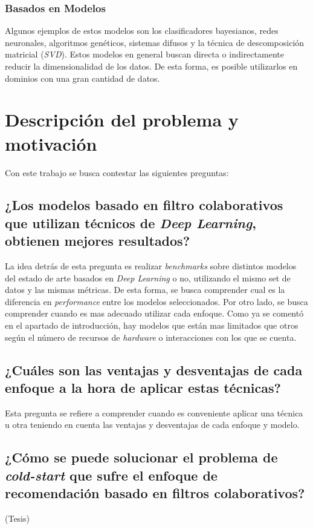 \documentclass[11pt,a4paper,twoside]{thesis}
\begin{document}
\subsubsection{Basados en Modelos}

Algunos ejemplos de estos modelos son los clasificadores bayesianos, redes
neuronales, algoritmos genéticos, sistemas difusos y la técnica de
descomposición matricial (\textit{SVD}). Estos modelos en general buscan
directa o indirectamente reducir la dimensionalidad de los datos. De esta
forma, es posible utilizarlos en dominios con una gran cantidad de datos.

\clearpage
\section{Descripción del problema y motivación}

Con este trabajo se busca contestar las siguientes preguntas:

\subsection{¿Los modelos basado en filtro colaborativos que utilizan técnicos de \textit{Deep Learning}, obtienen mejores resultados?}

La idea detrás de esta pregunta es realizar \textit{benchmarks} sobre distintos
modelos del estado de arte basados en \textit{Deep Learning} o no, utilizando
el mismo set de datos y las mismas métricas. De esta forma, se busca comprender
cual es la diferencia en \textit{performance} entre los modelos seleccionados.
Por otro lado, se busca comprender cuando es mas adecuado utilizar cada
enfoque. Como ya se comentó en el apartado de introducción, hay modelos que
están mas limitados que otros según el número de recursos de \textit{hardware}
o interacciones con los que se cuenta.

\subsection{¿Cuáles son las ventajas y desventajas de cada enfoque a la hora de aplicar estas técnicas?}

Esta pregunta se refiere a comprender cuando es conveniente aplicar una técnica
u otra teniendo en cuenta las ventajas y desventajas de cada enfoque y modelo.

\subsection{¿Cómo se puede solucionar el problema de \textit{cold-start} que sufre el enfoque de recomendación basado en filtros colaborativos?} (Tesis)
\end{document}
